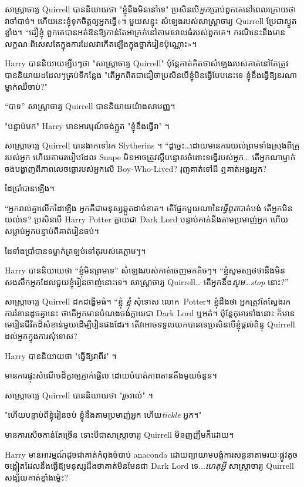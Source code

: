 {{{{{សាស្រ្តាចារ្យ Quirrell បាននិយាយថា "ខ្ញុំនឹងមិននៅទេ" ប្រសិនបើ\emph{អ្នក}ប្រាប់ពួកគេនៅពេលក្រោយថាវាចាំបាច់។ ហើយ​នេះ​ខ្ញុំ​ទុក​ចិត្ត​ឲ្យ​អ្នក​ធ្វើ»។ មួយសន្ទុះ សំឡេងរបស់សាស្ត្រាចារ្យ Quirrell ប្រែជាស្ងួតខ្លាំង។ “ជឿខ្ញុំ ពួកគេបានអត់ឱនឱ្យកាន់តែអាក្រក់នៅតាមសាលធំរបស់ពួកគេ។ ករណី​នេះ​នឹង​មាន​លក្ខណៈ​ពិសេស​តែ​ក្នុង​ការ​ដែល​វា​កើត​ឡើង​ក្នុង​ថ្នាក់​រៀន​ប៉ុណ្ណោះ»។

Harry បាននិយាយខ្សឹបៗថា "សាស្រ្តាចារ្យ Quirrell" ប៉ុន្តែគាត់គិតថាសំឡេងរបស់គាត់នៅតែត្រូវបាននិយាយដដែលៗគ្រប់ទីកន្លែង "តើអ្នកពិតជាជឿថាប្រសិនបើខ្ញុំមិនធ្វើបែបនេះទេ ខ្ញុំនឹងធ្វើឱ្យនរណាម្នាក់ឈឺចាប់?"

“បាទ” សាស្ត្រាចារ្យ Quirrell បាននិយាយយ៉ាងសាមញ្ញ។

"បន្ទាប់មក" Harry មានអារម្មណ៍ចង់ក្អួត "ខ្ញុំនឹងធ្វើវា" ។

សាស្រ្តាចារ្យ Quirrell បានងាកទៅរក Slytherins ។ “ដូច្នេះ…ដោយមានការយល់ព្រមទាំងស្រុងពីគ្រូរបស់អ្នក ហើយតាមរបៀបដែល Snape មិនអាចត្រូវស្តីបន្ទោសចំពោះទង្វើរបស់អ្នក… តើអ្នកណាម្នាក់ចង់បង្ហាញពីភាពលេចធ្លោរបស់អ្នកលើ Boy-Who-Lived? រុញគាត់ទៅដី ឮគាត់អង្វរអ្នក?

ដៃប្រាំបានឡើង។

“អ្នក​រាល់​គ្នា​លើក​ដៃ​ឡើង អ្នក​គឺ​ជា​មនុស្ស​ឆ្កួត​ដាច់​ខាត។ តើផ្នែកមួយណានៃ\emph{ធ្វើពុត}បាត់បង់ តើអ្នកមិនយល់ទេ? ប្រសិនបើ Harry Potter ក្លាយជា Dark Lord បន្ទាប់គាត់នឹងតាមប្រមាញ់អ្នក ហើយសម្លាប់អ្នកបន្ទាប់ពីគាត់រៀនចប់។

ដៃទាំងប្រាំបានទម្លាក់ត្រឡប់ទៅតុរបស់គេភ្លាមៗ។

Harry បាននិយាយថា “ខ្ញុំមិនព្រមទេ” សំឡេងរបស់គាត់ចេញមកតិចៗ។ “ខ្ញុំ​សូម​ស្បថ​ថា​នឹង​មិន​សងសឹក​អ្នក​ដែល​ជួយ​ខ្ញុំ​រៀន​ចាញ់​នោះ​ទេ។ សាស្រ្តាចារ្យ Quirrell… តើអ្នកនឹង\emph{សូម}…\emph{stop} នោះ?”

សាស្រ្តាចារ្យ Quirrell ដកដង្ហើមធំ។ “ខ្ញុំ \emph{ខ្ញុំ} សុំទោស លោក~Potter។ ខ្ញុំដឹងថា អ្នកត្រូវតែស្វែងរកការរំខានដូចគ្នានេះ ថាតើអ្នកមានបំណងចង់ក្លាយជា Dark Lord ឬអត់។ ប៉ុន្តែកុមារទាំងនោះ \emph{}ក៏មានមេរៀនជីវិតដ៏សំខាន់មួយដើម្បីរៀនផងដែរ។ តើ​វា​អាច​ទទួល​យក​បាន​ទេ​ប្រសិន​បើ​ខ្ញុំ​ផ្តល់​ពិន្ទុ Quirrell ដល់​អ្នក​ក្នុង​ការ​សុំទោស?

Harry បាននិយាយថា "ធ្វើឱ្យវាពីរ" ។

មាន​ការ​ផ្ទុះ​សំណើច​ដ៏​គួរ​ឲ្យ​ភ្ញាក់​ផ្អើល ដោយ​បំបាត់​ភាព​តានតឹង​មួយ​ចំនួន។

សាស្រ្តាចារ្យ Quirrell បាននិយាយថា "រួចរាល់" ។

"ហើយបន្ទាប់ពីខ្ញុំរៀនចប់ ខ្ញុំនឹងតាមប្រមាញ់អ្នក ហើយ\emph{tickle} អ្នក។"

មានការសើចកាន់តែច្រើន ទោះបីជាសាស្រ្តាចារ្យ Quirrell មិនញញឹមក៏ដោយ។

Harry មានអារម្មណ៍ដូចជាគាត់កំពុងចំបាប់ anaconda ដោយព្យាយាមបង្ខំការសន្ទនាតាមរយៈផ្លូវតូចចង្អៀតដែលនឹងធ្វើឱ្យមនុស្សដឹងថាគាត់មិនមែនជា Dark Lord ទេ...\emph{ហេតុអ្វី} សាស្រ្តាចារ្យ Quirrell សង្ស័យគាត់ខ្លាំងម្ល៉េះ?

}}}}}
